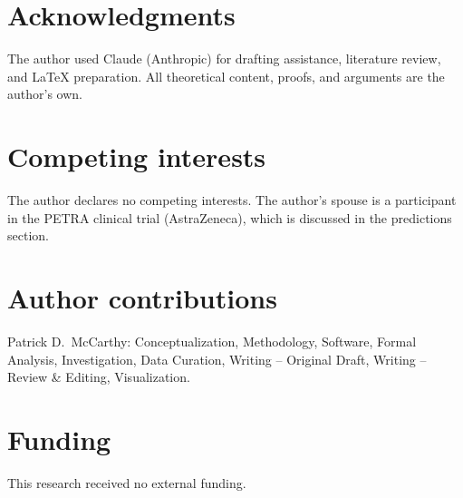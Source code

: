 \documentclass[11pt]{article}
\begin{document}

\section*{Acknowledgments}

The author used Claude (Anthropic) for drafting assistance,
literature review, and \LaTeX{} preparation. All theoretical
content, proofs, and arguments are the author's own.


\section*{Competing interests}

The author declares no competing interests. The author's spouse is
a participant in the PETRA clinical trial (AstraZeneca), which is
discussed in the predictions section.


\section*{Author contributions}

Patrick D.\ McCarthy: Conceptualization, Methodology, Software,
Formal Analysis, Investigation, Data Curation, Writing -- Original
Draft, Writing -- Review \& Editing, Visualization.


\section*{Funding}

This research received no external funding.

\end{document}
